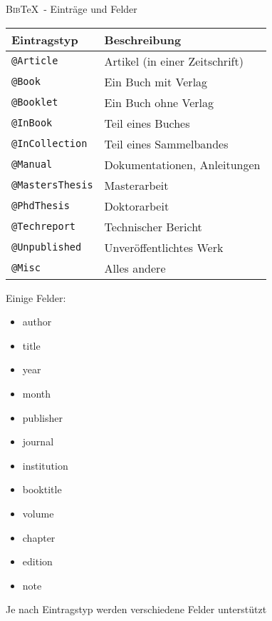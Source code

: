 \documentclass[aspectratio=169]{beamer}
\providecommand{\tightlist}{\setlength{\itemsep}{0pt}\setlength{\parskip}{0pt}}
\newcommand\citestyle[1]{\textcolor{foreground-secondary}{\textsuperscript{#1}}}
\let\oldcite=\cite
\renewcommand{\cite}[1]{\citestyle{\oldcite{#1}}}
\let\oldautocite\autocite
\renewcommand{\autocite}[1]{\citestyle{\oldautocite{#1}}}
\begin{document}
    \begin{frame}[fragile]{\textsc{Bib}\TeX~- Einträge und Felder}
    \protect\hypertarget{eintruxe4ge-und-felder}{}
    \begin{minipage}{0.7\textwidth}

    \begin{longtable}[]{@{}ll@{}}
    \toprule()
    Eintragstyp & Beschreibung \\
    \midrule()
    \endhead
    \texttt{@Article} & Artikel (in einer Zeitschrift) \cite{bibtex} \\
    \texttt{@Book} & Ein Buch mit Verlag \cite{bibtex} \\
    \texttt{@Booklet} & Ein Buch ohne Verlag \cite{bibtex} \\
    \texttt{@InBook} & Teil eines Buches \cite{bibtex} \\
    \texttt{@InCollection} & Teil eines Sammelbandes \cite{bibtex} \\
    \texttt{@Manual} & Dokumentationen, Anleitungen \cite{bibtex} \\
    \texttt{@MastersThesis} & Masterarbeit \cite{bibtex} \\
    \texttt{@PhdThesis} & Doktorarbeit \cite{bibtex} \\
    \texttt{@Techreport} & Technischer Bericht \cite{bibtex} \\
    \texttt{@Unpublished} & Unveröffentlichtes Werk \cite{bibtex} \\
    \texttt{@Misc} & Alles andere \cite{bibtex} \\
    \bottomrule()
    \end{longtable}

    \end{minipage}\begin{minipage}{0.3\textwidth}

    \phantom{m}Einige Felder: \autocite{bibtex}

    \begin{itemize}
    \tightlist
    \item
      author
    \item
      title
    \item
      year
    \item
      month
    \item
      publisher
    \item
      journal
    \item
      institution
    \item
      booktitle
    \item
      volume
    \item
      chapter
    \item
      edition
    \item
      note
    \end{itemize}

    \vfill

    \end{minipage}

    Je nach Eintragstyp werden verschiedene Felder unterstützt
    \autocite{bibtex}
    \end{frame}
\end{document}

